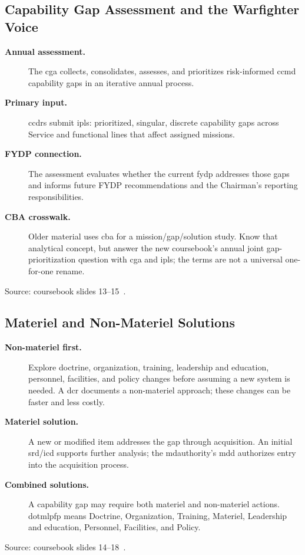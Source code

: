 \documentclass[../main.tex]{subfiles}
\begin{document}
\subsection{Capability Gap Assessment and the Warfighter Voice}
\begin{description}
  \item[\textbf{Annual assessment.}] The \ac{cga} collects, consolidates, assesses, and prioritizes risk-informed \ac{ccmd} capability gaps in an iterative annual process.
  \item[\textbf{Primary input.}] \acp{ccdr} submit \acp{ipl}: prioritized, singular, discrete capability gaps across Service and functional lines that affect assigned missions.
  \item[\textbf{FYDP connection.}] The assessment evaluates whether the current \ac{fydp} addresses those gaps and informs future FYDP recommendations and the Chairman's reporting responsibilities.
  \item[\textbf{CBA crosswalk.}] Older material uses \ac{cba} for a mission/gap/solution study. Know that analytical concept, but answer the new coursebook's annual joint gap-prioritization question with \ac{cga} and \acp{ipl}; the terms are not a universal one-for-one rename.
\end{description}
\noindent Source: coursebook slides 13--15~\autocite{edo-3-3-3-jfrp-2026}.

\subsection{Materiel and Non-Materiel Solutions}
\begin{description}
  \item[\textbf{Non-materiel first.}] Explore doctrine, organization, training, leadership and education, personnel, facilities, and policy changes before assuming a new system is needed. A \ac{dcr} documents a non-materiel approach; these changes can be faster and less costly.
  \item[\textbf{Materiel solution.}] A new or modified item addresses the gap through acquisition. An initial \ac{srd}/\ac{icd} supports further analysis; the \ac{mdauthority}'s \ac{mdd} authorizes entry into the acquisition process.
  \item[\textbf{Combined solutions.}] A capability gap may require both materiel and non-materiel actions. \ac{dotmlpfp} means Doctrine, Organization, Training, Materiel, Leadership and education, Personnel, Facilities, and Policy.
\end{description}
\noindent Source: coursebook slides 14--18~\autocite{edo-3-3-3-jfrp-2026}.
\end{document}
